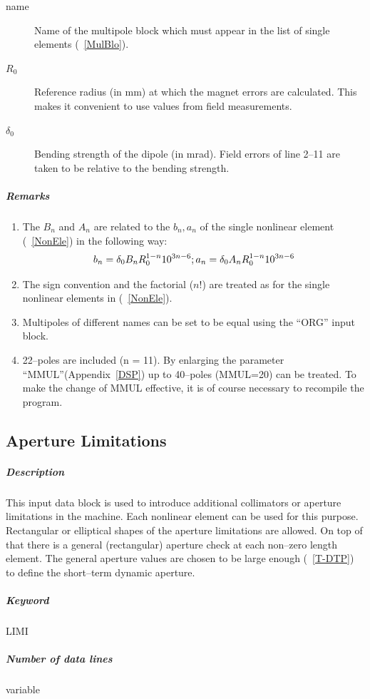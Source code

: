 \documentclass[a4paper,11pt]{report}
\begin{document}
\begin{description}
\item [name] Name of the multipole block which must appear in the list
  of single elements (~\ref{MulBlo}).
\item [$ R_{0} $] Reference radius (in mm) at which the magnet errors
  are calculated.  This makes it convenient to use values from field
  measurements.
\item [$ \delta_{0} $] Bending strength of the dipole (in mrad). Field
  errors of line 2--11 are taken to be relative to the bending
  strength.
\end{description}

\subparagraph{Remarks}
\begin{enumerate}
\item The $ B_{n} $ and $ A_{n} $ are related to the $ b_{n}, a_{n} $
  of the single nonlinear element (~\ref{NonEle}) in the following
  way:
  $$
  b_{n} = \delta_{0} B_{n} R_{0}^{1-n} 10^{3n-6}; \\
  a_{n} = \delta_{0} A_{n} R_{0}^{1-n} 10^{3n-6}
  $$
\item The sign convention and the factorial ($n$!) are treated as for
  the single nonlinear elements in (~\ref{NonEle}).
\item Multipoles of different names can be set to be equal using the
  ``ORG'' input block.
\item 22--poles are included (n = 11). By enlarging the parameter
  ``MMUL''(Appendix~\ref{DSP}) up to 40--poles (MMUL=20) can be
  treated. To make the change of MMUL effective, it is of course
  necessary to recompile the program.
\end{enumerate}

\subsection{Aperture Limitations} \label{ApeLim}

\subparagraph{Description} This input data block is used to introduce
additional collimators or aperture limitations in the machine.  Each
nonlinear element can be used for this purpose. Rectangular or
elliptical shapes of the aperture limitations are allowed. On top of
that there is a general (rectangular) aperture check at each non--zero
length element. The general aperture values are chosen to be large
enough (~\ref{T-DTP}) to define the short--term dynamic aperture.

\subparagraph{Keyword} LIMI \subparagraph{Number of data lines}
variable
\end{document}
